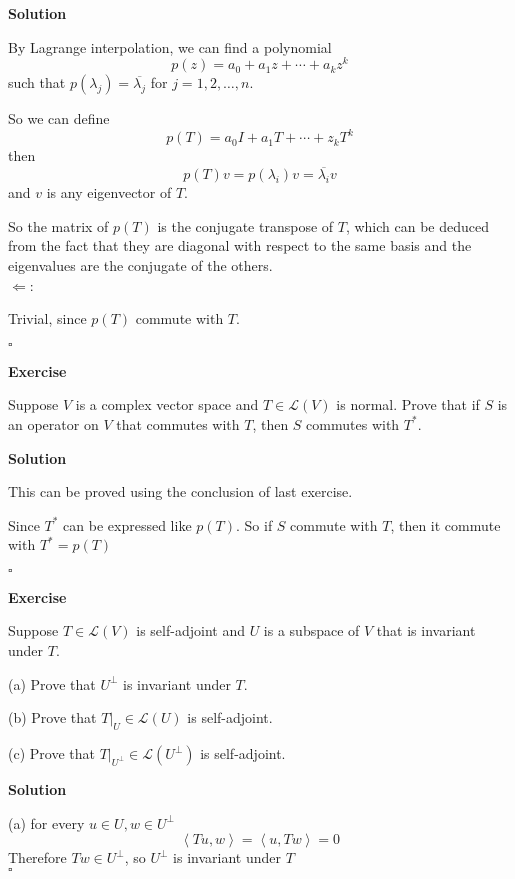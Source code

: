 \documentclass{article}
\newenvironment{exercise}{%
{\textbf{Exercise\\}
    }
}{
}
\newenvironment{solution}{%
{
    \textbf{Solution\\}
    }
}{
  \hfill $\square$ 
  \par\bigskip 
}
\newcommand{\RR}{\mathbb{R}}
\newcommand{\FF}{\mathbb{F}}
\begin{document}
\begin{CJK}{UTF8}{gkai}
\begin{solution}
    By Lagrange interpolation, we can find a polynomial
    \[p(z) = a_0 + a_1 z + \cdots + a_k z^k\]
    such that $p(\lambda_j) = \overline{\lambda_j}$ for $j = 1, 2, \ldots, n$.

    So we can define 
    \[p(T) = a_0 I + a_1 T + \cdots + z_k T^k\]
    then 
    \[p(T) v = p(\lambda_i) v = \overline{\lambda_i} v\]
    and $v$ is any eigenvector of $T$.

    So the matrix of $p(T)$ is the conjugate transpose of $T$, which can be deduced from the fact that they are diagonal with respect to the same basis and the eigenvalues are the conjugate of the others.\\

    $\Leftarrow$:

    Trivial, since $p(T)$ commute with $T$.
    
\end{solution}

\begin{exercise}
    Suppose $V$ is a complex vector space and $T \in  \mathcal{L}(V)$ is normal. Prove that if $S$ is an operator on $V$ that commutes with $T$, then $S$ commutes with $T^\ast$.
\end{exercise}    

\begin{solution}
    This can be proved using the conclusion of last exercise.

    Since $T^\ast$ can be expressed like $p(T)$. So if $S$ commute with $T$, then it commute with $T^\ast = p(T)$ 
\end{solution}
    
\begin{exercise}
    Suppose $T \in \mathcal{L}(V)$ is self-adjoint and $U$ is a subspace of $V$ that is invariant under $T$.

    (a) Prove that $U^\bot$ is invariant under $T$.

    (b) Prove that $T|_U \in \mathcal{L}(U)$ is self-adjoint.

    (c) Prove that $T|_{U^\bot} \in \mathcal{L}(U^\bot)$ is self-adjoint.
\end{exercise}

\begin{solution}

    (a) for every $u \in U, w \in U^\bot$
    \[\left<Tu,w\right> = \left<u,Tw\right> = 0\]
    Therefore $Tw \in U^\bot$, so $U^\bot$ is invariant under $T$\\


\end{solution}
\end{CJK}
\end{document}
